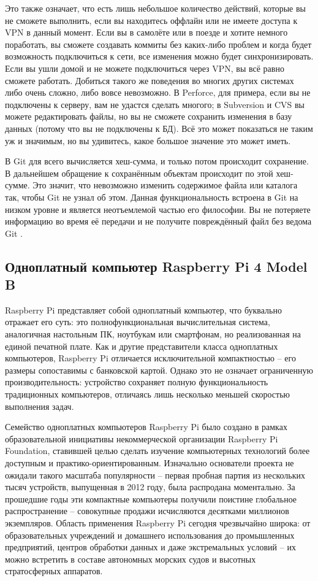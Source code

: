 Это также означает, что есть лишь небольшое количество действий, которые вы не сможете выполнить, если вы находитесь оффлайн или не имеете доступа к VPN в данный момент. Если вы в самолёте или в поезде и хотите немного поработать, вы сможете создавать коммиты без каких-либо проблем и когда будет возможность подключиться к сети, все изменения можно будет синхронизировать. Если вы ушли домой и не можете подключиться через VPN, вы всё равно сможете работать.
Добиться такого же поведения во многих других системах либо очень сложно, либо вовсе невозможно. В Perforce, для примера, если вы не подключены к серверу, вам не удастся сделать многого; в Subversion и CVS вы можете редактировать файлы, но вы не сможете сохранить изменения в базу данных (потому что вы не подключены к БД). Всё это может показаться не таким уж и значимым, но вы удивитесь, какое большое значение это может
иметь.

В Git для всего вычисляется хеш-сумма, и только потом происходит сохранение. В
дальнейшем обращение к сохранённым объектам происходит по этой хеш-сумме. Это
значит, что невозможно изменить содержимое файла или каталога так, чтобы Git не узнал об этом. Данная функциональность встроена в Git на низком уровне и является неотъемлемой частью его философии. Вы не потеряете информацию во время её передачи и не получите повреждённый файл без ведома Git \cite{ProGit}.

\subsection{Одноплатный компьютер Raspberry Pi 4 Model B}

Raspberry Pi представляет собой одноплатный компьютер, что буквально отражает его суть: это полнофункциональная вычислительная система, аналогичная настольным ПК, ноутбукам или смартфонам, но реализованная на единой печатной плате. Как и другие представители класса одноплатных компьютеров, Raspberry Pi отличается исключительной компактностью -- его размеры сопоставимы с банковской картой. Однако это не означает ограниченную производительность: устройство сохраняет полную функциональность традиционных компьютеров, отличаясь лишь несколько меньшей скоростью выполнения задач.

Семейство одноплатных компьютеров Raspberry Pi было создано в рамках образовательной инициативы некоммерческой организации Raspberry Pi Foundation, ставившей целью сделать изучение компьютерных технологий более доступным и практико-ориентированным. Изначально основатели проекта не ожидали такого масштаба популярности -- первая пробная партия из нескольких тысяч устройств, выпущенная в 2012 году, была распродана моментально. За прошедшие годы эти компактные компьютеры получили поистине глобальное распространение -- совокупные продажи исчисляются десятками миллионов экземпляров. Область применения Raspberry Pi сегодня чрезвычайно широка: от образовательных учреждений и домашнего использования до промышленных предприятий, центров обработки данных и даже экстремальных условий -- их можно встретить в составе автономных морских судов и высотных стратосферных аппаратов.

